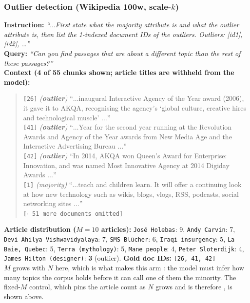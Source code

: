 \subsubsection{Outlier detection (Wikipedia 100w, scale-$k$)}

\textbf{Instruction:} \emph{``$\dots$First state what the majority attribute is and what the outlier
attribute is, then list the 1-indexed document IDs of the outliers. Outliers: [id1], [id2], \dots''}\\
\textbf{Query:} \emph{``Can you find passages that are about a different topic than the rest of these
passages?''}\\
\textbf{Context (4 of 55 chunks shown; article titles are withheld from the model):}
\begin{quote}\small
\texttt{[26]} \emph{(\textbf{outlier})} ``$\dots$inaugural Interactive Agency of the Year award
(2006), it gave it to AKQA, recognising the agency's `global culture, creative hires and
technological muscle' $\dots$''\\
\texttt{[41]} \emph{(\textbf{outlier})} ``$\dots$Year for the second year running at the Revolution
Awards and Agency of the Year awards from New Media Age and the Interactive Advertising Bureau
$\dots$''\\
\texttt{[42]} \emph{(\textbf{outlier})} ``In 2014, AKQA won Queen's Award for Enterprise: Innovation,
and was named Most Innovative Agency at 2014 Digiday Awards $\dots$''\\
\texttt{[1]} \emph{(majority)} ``$\dots$teach and children learn. It will offer a continuing look at
how new technology such as wikis, blogs, vlogs, RSS, podcasts, social networking sites $\dots$''\\
\texttt{[$\cdot$ 51 more documents omitted]}
\end{quote}
\textbf{Article distribution ($M{=}10$ articles):} \texttt{Jos\'e Holebas}: 9, \texttt{Andy Carvin}:
7, \texttt{Devi Ahilya Vishwavidyalaya}: 7, \texttt{SMS Bl\"ucher}: 6, \texttt{Iraqi insurgency}: 5,
\texttt{La Baie, Quebec}: 5, \texttt{Terra (mythology)}: 5, \texttt{Mane people}: 4, \texttt{Peter
Sloterdijk}: 4, \texttt{James Hilton (designer)}: \textbf{3} (outlier).\quad
\textbf{Gold doc IDs:} \texttt{[26, 41, 42]}\\
$M$ grows with $N$ here, which is what makes this arm : the model must infer how many topics
the corpus holds before it can call one of them the minority. The fixed-$M$ control, which pins the
article count as $N$ grows and is therefore , is shown above.

